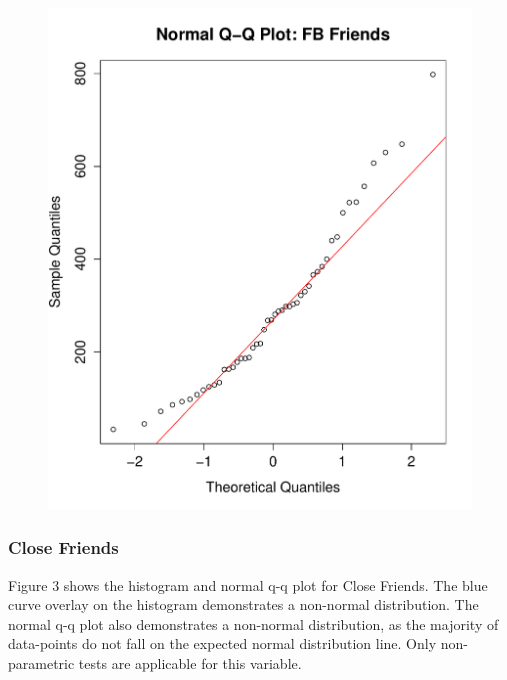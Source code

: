 \begin{figure}[H]
\includegraphics[scale=0.35]{./img/qqplot_fbfriends.pdf}
\end{figure}

\subsubsection{Close Friends}

Figure 3 shows the histogram and normal q-q plot for Close Friends. The blue curve overlay on the histogram demonstrates a non-normal distribution. The normal q-q plot also demonstrates a non-normal distribution, as the majority of data-points do not fall on the expected normal distribution line. Only non-parametric tests are applicable for this variable.

